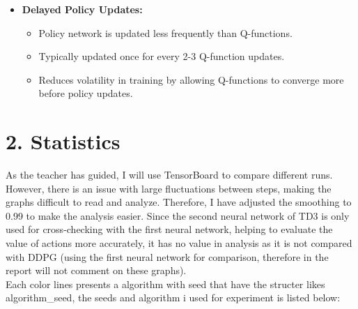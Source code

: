 \documentclass[english, a4paper,12pt]{article}
\begin{document}
\begin{itemize}
\begin{itemize}
        \item Takes the minimum Q-value between the two critics for target calculation:
            \begin{center}
                
            \end{center}
                \begin{flushright}
        \vspace*{-1mm}
        \scriptsize [1]: \href{https://spinningup.openai.com/en/latest/algorithms/ddpg.html}{Deep Deterministic Policy Gradient}\\
        \scriptsize [2]: \href{https://spinningup.openai.com/en/latest/algorithms/td3.html}{Twin Delayed DDPG}
        \end{flushright}
        \item Both Q-functions are trained using this same target.
        \item Helps prevent overestimation bias common in DDPG.
    \end{itemize}
    \vspace*{-2mm}
    \item \textbf{Delayed Policy Updates:}
    \vspace*{-2mm}
    \begin{itemize}
        \item Policy network is updated less frequently than Q-functions.
        \item Typically updated once for every 2-3 Q-function updates.
        \item Reduces volatility in training by allowing Q-functions to converge more before policy updates.
    \end{itemize}
\end{itemize}
\begin{center}
    
\end{center}
\vspace*{-7mm}
\section*{2. Statistics}
\hspace*{5mm} As the teacher has guided, I will use TensorBoard to compare different runs. However, there is an issue with large fluctuations between steps, making the graphs difficult to read and analyze. Therefore, I have adjusted the smoothing to 0.99 to make the analysis easier. Since the second neural network of TD3 is only used for cross-checking with the first neural network, helping to evaluate the value of actions more accurately, it has no value in analysis as it is not compared with DDPG (using the first neural network for comparison, therefore in the report will not comment on these graphs).
\\
\hspace*{5mm}  Each color lines presents a algorithm with seed that have the structer likes algorithm\_seed, the seeds and algorithm i used for experiment is listed below:
\end{document}
